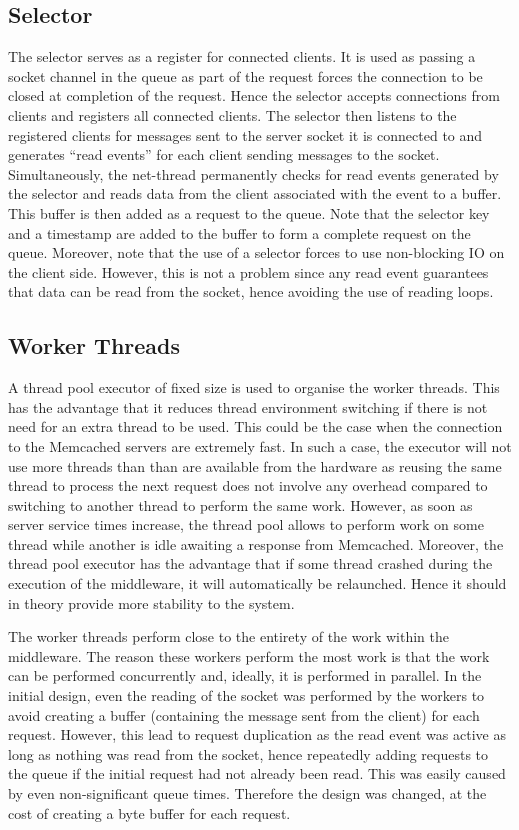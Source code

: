 \documentclass[11pt,a4paper]{article}
\begin{document}
\subsection{Selector}
The selector serves as a register for connected clients. It is used as passing a socket channel in the queue as part of the request forces the connection to be closed at completion of the request. Hence the selector accepts connections from clients and registers all connected clients. The selector then listens to the registered clients for messages sent to the server socket it is connected to and generates ``read events'' for each client sending messages to the socket. Simultaneously, the net-thread permanently checks for read events generated by the selector and reads data from the client associated with the event to a buffer. This buffer is then added as a request to the queue. Note that the selector key and a timestamp are added to the buffer to form a complete request on the queue. Moreover, note that the use of a selector forces to use non-blocking IO on the client side. However, this is not a problem since any read event guarantees that data can be read from the socket, hence avoiding the use of reading loops.

\subsection{Worker Threads}
A thread pool executor of fixed size is used to organise the worker threads. This has the advantage that it reduces thread environment switching if there is not need for an extra thread to be used. This could be the case when the connection to the Memcached servers are extremely fast. In such a case, the executor will not use more threads than than are available from the hardware as reusing the same thread to process the next request does not involve any overhead compared to switching to another thread to perform the same work. However, as soon as server service times increase, the thread pool allows to perform work on some thread while another is idle awaiting a response from Memcached. Moreover, the thread pool executor has the advantage that if some thread crashed during the execution of the middleware, it will automatically be relaunched. Hence it should in theory provide more stability to the system.

The worker threads perform close to the entirety of the work within the middleware. The reason these workers perform the most work is that the work can be performed concurrently and, ideally, it is performed in parallel. In the initial design, even the reading of the socket was performed by the workers to avoid creating a buffer (containing the message sent from the client) for each request. However, this lead to request duplication as the read event was active as long as nothing was read from the socket, hence repeatedly adding requests to the queue if the initial request had not already been read. This was easily caused by even non-significant queue times. Therefore the design was changed, at the cost of creating a byte buffer for each request.
\end{document}
